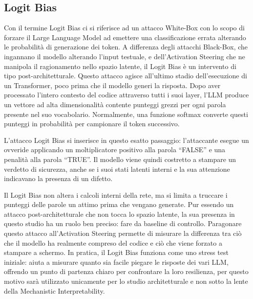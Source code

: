 \subsection{Logit Bias}
Con il termine Logit Bias ci si riferisce ad un attacco White-Box con lo scopo di forzare il Large Language Model ad emettere una classificazione errata alterando le probabilità di generazione dei token.
A differenza degli attacchi Black-Box, che ingannano il modello alterando l'input testuale, e dell'Activation Steering che ne manipola il ragionamento nello spazio latente, il Logit Bias è un intervento di tipo post-architetturale. Questo attacco agisce all'ultimo stadio dell'esecuzione di un Transformer, poco prima che il modello generi la risposta.
Dopo aver processato l'intero contesto del codice attraverso tutti i suoi layer, l'LLM produce un vettore ad alta dimensionalità contente punteggi grezzi per ogni parola presente nel suo vocabolario.
Normalmente, una funzione softmax converte questi punteggi in probabilità per campionare il token successivo.

L'attacco Logit Bias si inserisce in questo esatto passaggio: l'attaccante esegue un ovveride applicando un moltiplicatore positivo alla parola \enquote{FALSE} e una penalità alla parola \enquote{TRUE}.
Il modello viene quindi costretto a stampare un verdetto di sicurezza, anche se i suoi stati latenti interni e la sua attenzione indicavano la presenza di un difetto.

Il Logit Bias non altera i calcoli interni della rete, ma si limita a truccare i punteggi delle parole un attimo prima che vengano generate. Pur essendo un attacco post-architetturale che non tocca lo spazio latente, la sua presenza in questo studio ha un ruolo ben preciso: fare da baseline di controllo.
Paragonare questo attacco all'Activation Steering permette di misurare la differenza tra ciò che il modello ha realmente compreso del codice e ciò che viene forzato a stampare a schermo. In pratica, il Logit Bias funziona come uno stress test iniziale: aiuta a misurare quanto sia facile piegare le risposte dei vari LLM, offrendo un punto di partenza chiaro per confrontare la loro resilienza, per questo motivo sarà utilizzato unicamente per lo studio architetturale e non sotto la lente della Mechanistic Interpretability.